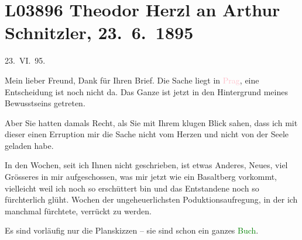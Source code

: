 

\section[Theodor Herzl an Arthur Schnitzler, 23. 6. 1895]{L03896 Theodor Herzl an Arthur Schnitzler, 23. 6. 1895}
\nopagebreak{}
\rehead{ }\normalsize\beginnumbering{}
\toendnotes[C]{\smallbreak\pagebreak[2]}
\toendnotes[C]{\smallbreak}
\pstart
           \raggedleft{}{\pb}23. VI. 95.\pend
           
\pstart{}Mein lieber Freund,\pend\vspace{0.5em}
\pstart
           Dank für Ihren Brief. Die Sache liegt in \textcolor{pink}{Prag}\ledrightnote{\textcolor{pink}{Prag}}, eine
               Entscheidung ist noch nicht da. Das Ganze ist jetzt in den Hintergrund meines
               Bewusstseins getreten.\pend
           
\pstart
           Aber Sie hatten damals Recht, als Sie mit Ihrem klugen Blick sahen, dass ich mit
               dieser einen Erruption mir die Sache nicht vom Herzen und nicht von der Seele geladen
               habe.\pend
           
\pstart
           In den Wochen, seit ich Ihnen nicht geschrieben, ist etwas Anderes, Neues, viel
               Grösseres in mir aufgeschossen, was mir jetzt wie ein Basaltberg vorkommt, vielleicht
               weil ich noch so erschüttert bin und das Entstandene noch so fürchterlich glüht. {\pb}Wochen der ungeheuerlichsten Poduktionsaufregung, in
               der ich manchmal fürchtete, verrückt zu werden.\pend
           
\pstart
           Es sind vorläufig nur die Planskizzen – sie sind schon ein ganzes \textcolor{green}{Buch}\ledrightnote{{$\rightarrow$}\emph{\textcolor{green}{Der Judenstaat. Versuch einer modernen Lösung der Judenfrage}}}.\pend
           
